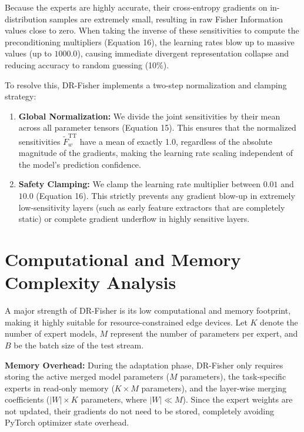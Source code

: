 \documentclass{article}
\theoremstyle{plain}
\theoremstyle{definition}
\theoremstyle{remark}
\begin{document}
Because the experts are highly accurate, their cross-entropy gradients on in-distribution samples are extremely small, resulting in raw Fisher Information values close to zero. When taking the inverse of these sensitivities to compute the preconditioning multipliers (Equation 16), the learning rates blow up to massive values (up to $1000.0$), causing immediate divergent representation collapse and reducing accuracy to random guessing (10\%).

To resolve this, DR-Fisher implements a two-step normalization and clamping strategy:
\begin{enumerate}
    \item \textbf{Global Normalization:} We divide the joint sensitivities by their mean across all parameter tensors (Equation 15). This ensures that the normalized sensitivities $\tilde{F}_w^{\text{TT}}$ have a mean of exactly 1.0, regardless of the absolute magnitude of the gradients, making the learning rate scaling independent of the model's prediction confidence.
    \item \textbf{Safety Clamping:} We clamp the learning rate multiplier between $0.01$ and $10.0$ (Equation 16). This strictly prevents any gradient blow-up in extremely low-sensitivity layers (such as early feature extractors that are completely static) or complete gradient underflow in highly sensitive layers.
\end{enumerate}

\section{Computational and Memory Complexity Analysis}
\label{appendix:complexity}
A major strength of DR-Fisher is its low computational and memory footprint, making it highly suitable for resource-constrained edge devices. Let $K$ denote the number of expert models, $M$ represent the number of parameters per expert, and $B$ be the batch size of the test stream.

\textbf{Memory Overhead:} During the adaptation phase, DR-Fisher only requires storing the active merged model parameters ($M$ parameters), the task-specific experts in read-only memory ($K \times M$ parameters), and the layer-wise merging coefficients ($|W| \times K$ parameters, where $|W| \ll M$). Since the expert weights are not updated, their gradients do not need to be stored, completely avoiding PyTorch optimizer state overhead.
\end{document}
